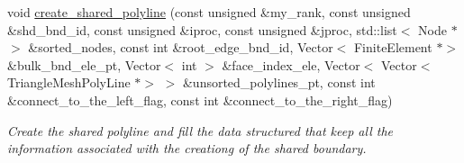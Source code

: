 \begin{DoxyCompactItemize}
void \hyperlink{classoomph_1_1TriangleMesh_ac59a791cf11147bc54b17a12a35e9707}{create\+\_\+shared\+\_\+polyline} (const unsigned \&my\+\_\+rank, const unsigned \&shd\+\_\+bnd\+\_\+id, const unsigned \&iproc, const unsigned \&jproc, std\+::list$<$ Node $\ast$$>$ \&sorted\+\_\+nodes, const int \&root\+\_\+edge\+\_\+bnd\+\_\+id, Vector$<$ Finite\+Element $\ast$$>$ \&bulk\+\_\+bnd\+\_\+ele\+\_\+pt, Vector$<$ int $>$ \&face\+\_\+index\+\_\+ele, Vector$<$ Vector$<$ Triangle\+Mesh\+Poly\+Line $\ast$$>$ $>$ \&unsorted\+\_\+polylines\+\_\+pt, const int \&connect\+\_\+to\+\_\+the\+\_\+left\+\_\+flag, const int \&connect\+\_\+to\+\_\+the\+\_\+right\+\_\+flag)
\begin{DoxyCompactList}\small\item\em Create the shared polyline and fill the data structured that keep all the information associated with the creationg of the shared boundary. \end{DoxyCompactList}\end{DoxyCompactItemize}
